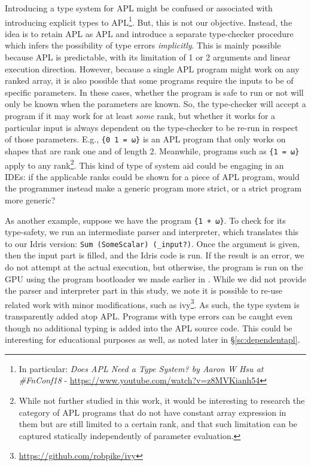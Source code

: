 \documentclass{report}
\begin{document}
Introducing a type system for APL might be confused or associated with introducing explicit types to APL\footnote{In particular: \emph{Does APL Need a Type System? by Aaron W Hsu at \#FnConf18} - \url{https://www.youtube.com/watch?v=z8MVKianh54}}. But, this is not our objective. Instead, the idea is to retain APL as APL and introduce a separate type-checker procedure which infers the possibility of type errors \emph{implicitly}. This is mainly possible because APL is predictable, with its limitation of 1 or 2 arguments and linear execution direction. However, because a single APL program might work on any ranked array, it is also possible that some programs require the inputs to be of specific parameters. In these cases, whether the program is safe to run or not will only be known when the parameters are known. So, the type-checker will accept a program if it may work for at least \emph{some} rank, but whether it works for a particular input is always dependent on the type-checker to be re-run in respect of those parameters. E.g., \verb|{0 1 = ⍵}| is an APL program that only works on shapes that are rank one and of length 2. Meanwhile, programs such as \verb|{1 = ⍵}| apply to any rank\footnote{While not further studied in this work, it would be interesting to research the category of APL programs that do not have constant array expression in them but are still limited to a certain rank, and that such limitation can be captured statically independently of parameter evaluation.}. This kind of type of system aid could be engaging in an \glspl{IDE}: if the applicable ranks could be shown for a piece of APL program, would the programmer instead make a generic program more strict, or a strict program more generic?

As another example, suppose we have the program \verb|{1 + ⍵}|. To check for its type-safety, we run an intermediate parser and interpreter, which translates this to our Idris version: \verb|Sum (SomeScalar) (_input?)|. Once the argument is given, then the input part is filled, and the Idris code is run. If the result is an error, we do not attempt at the actual execution, but otherwise, the program is run on the GPU using the program bootloader we made earlier in \cite{gpupoly}. While we did not provide the parser and interpreter part in this study, we note it is possible to re-use related work with minor modifications, such as ivy\footnote{\url{https://github.com/robpike/ivy}}. As such, the type system is transparently added atop APL. Programs with type errors can be caught even though no additional typing is added into the APL source code. This could be interesting for educational purposes as well, as noted later in §\ref{sc:dependentapl}.
\end{document}
